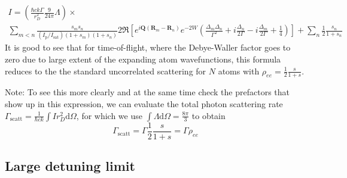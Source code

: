 \documentclass[11pt,letter]{article}
\newcommand{\bv}[1]{\ensuremath{\bm{#1}}}
\begin{document}
\begin{multline}
\label{eq:finalIdetector}
 I  =
 \left( 
 \frac{\hbar c k \Gamma}{r_{D}^{2}}  
     \frac{9}{24\pi} \Lambda 
  \right) \times \\
  \sum_{m<n} 
    \frac{ s_{m} s_{n} } 
         { (I_{\mathrm{p}}/I_{\mathrm{sat}}) ( 1+s_{m} )( 1+s_{n} ) }
    2 \Re\left[ 
               e^{ i \bv{Q}( \bv{R}_{m} - \bv{R}_{n} ) } e^{-2W}  
    \left(
        \frac{ \Delta_{m} \Delta_{n} }{ \Gamma^{2} } 
      + i \frac{ \Delta_{n} }{ 2 \Gamma } 
      - i \frac{ \Delta_{m} }{ 2 \Gamma } 
      + \frac{1}{4}  
    \right) \right]  
  + \sum_{n}  \frac{1}{2}
    \frac{ s_{n} } { 1 + s_{n} } 
\end{multline}
It is good to see that for time-of-flight, where the Debye-Waller factor goes
to zero due to large extent of the expanding atom wavefunctions,  this formula
reduces to the the standard uncorrelated scattering for $N$ atoms with
$\rho_{ee} = \frac{1}{2} \frac{s}{1+s}$.  

{\small
Note:  To see this more clearly and at the same time check the prefactors that show up in this expression, we can evaluate the total photon scattering rate  $\Gamma_{\mathrm{scatt}}= \frac{1}{\hbar c k}\int I r_{D}^{2} \mathrm{d}\Omega $,  for which we use $\int \Lambda \mathrm{d} \Omega = \frac{8\pi}{3}$ to obtain
\begin{equation}
\Gamma_{\mathrm{scatt}} =  \Gamma \frac{1}{2} \frac{s}{1+s} = \Gamma \rho_{ee}
\end{equation} 
 
}


\subsection{ Large detuning limit} 
\end{document}
